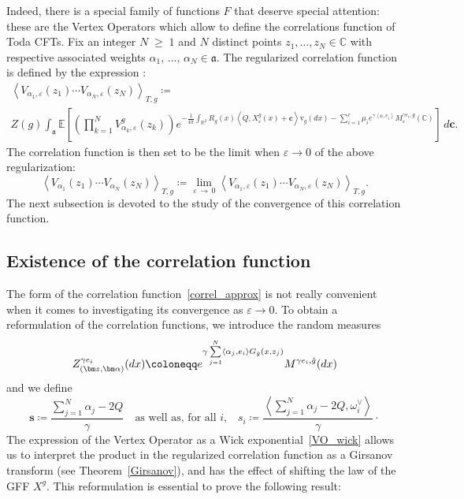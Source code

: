 \documentclass[AHL,Unicode,longabstracts,published]{cedram}
\renewcommand{\geq}{\;\geqslant\;}
\newcommand{\frka}{\mathfrak{a}}
\newcommand{\rmv}{\mathrm{v}}
\newcommand{\C}{\mathbb{C}}
\newcommand{\R}{\mathbb{R}}
\newcommand{\E}{\mathbb{E}}
\newcommand*\eps{\varepsilon}
\let\oldhat\hat
\renewcommand*{\hat}[1]{\mathchoice{\widehat{#1}}{\widehat{#1}}{\oldhat{#1}}{\oldhat{#1}}}
\begin{document}
Indeed, there is a special family of functions $F$ that deserve special attention: these are the Vertex Operators which allow to define the correlations function of Toda CFTs. Fix an integer $N\geq 1$ and $N$ distinct points $z_1,\dots,z_N\in \C$ with respective associated weights $\alpha_1,\,\dots,\,\alpha_N\in \frka$. The regularized correlation function is defined by the expression :
\begin{multline}\label{correl_approx}
\left\langle V_{\alpha_1,\eps}(z_1) \cdots V_{\alpha_N,\eps}(z_N) \right\rangle_{T,g} \coloneqq \\
Z(g) \int_{\frka} \E \left[\left(\prod_{k=1}^N V^g_{\alpha_k,\eps}(z_k) \right) e^{-\frac{1}{4 \pi} \int_{\R^2} R_g(x) \left\langle Q, X_\eps^g(x)+\bm c \right\rangle \rmv_ g(dx) - \sum_{i=1}^{r} \mu_i e^{\gamma \left\langle \bm c,e_i\right\rangle }M_\eps^{ \gamma e_i,g}(\C)} \right]\,d\bm c.
\end{multline}
The correlation function is then set to be the limit when $\eps\to0$ of the above regularization:
\begin{equation}\label{correl_limit}
\left\langle V_{\alpha_1}(z_1) \cdots V_{\alpha_N}(z_N) \right\rangle_{T,g} \coloneqq \underset{\eps\,\to\,0}{\lim} \left\langle V_{\alpha_1,\eps}(z_1) \cdots V_{\alpha_N,\eps}(z_N) \right\rangle_{T,g}.
\end{equation}
The next subsection is devoted to the study of the convergence of this correlation function.

\subsection{Existence of the correlation function}

The form of the correlation function~\eqref{correl_approx} is not really convenient when it comes to investigating its convergence as $\eps\to0$. To obtain a reformulation of the correlation functions, we introduce the random measures
\begin{equation}\label{GMC_insert}
Z_{\left(\bm z,\bm \alpha\right)}^{\gamma e_i} (dx)\coloneqq e^{\gamma \sum\limits_{j=1}^N \left\langle\alpha_j,e_i \right\rangle G_{\hat{g}} (x,z_j) } M^{\gamma e_i,\hat g}(dx)
\end{equation}
and we define
\begin{equation}
\bm s\coloneqq \frac{\sum\limits_{j=1}^N \alpha_j-2Q}\gamma\quad\text{as well as, for all $i$,}\quad s_i\coloneqq \frac{\left\langle \sum\limits_{j=1}^N \alpha_j-2Q,\omega_i^\vee \right\rangle}{\gamma} \cdot
\end{equation}
The expression of the Vertex Operator as a Wick exponential~\eqref{VO_wick} allows us to interpret the product in the regularized correlation function as a Girsanov transform (see Theorem~\ref{Girsanov}), and has the effect of shifting the law of the GFF $X^g$. This reformulation is essential to prove the following result:
\end{document}
